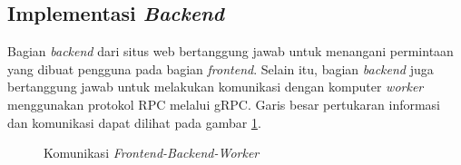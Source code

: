 \subsection{Implementasi \emph{Backend}}
\label{subsec:implementas-backend}

Bagian \emph{backend} dari situs web bertanggung jawab untuk menangani permintaan
yang dibuat pengguna pada bagian \emph{frontend}. Selain itu, bagian \emph{backend}
juga bertanggung jawab untuk melakukan komunikasi dengan komputer \emph{worker} menggunakan
protokol RPC melalui gRPC. Garis besar pertukaran informasi dan komunikasi
dapat dilihat pada gambar \ref{fig:frontend-backend-worker}.

\begin{figure}[H]
  \centering
  \caption{Komunikasi \emph{Frontend-Backend-Worker}}
  \label{fig:frontend-backend-worker}
\end{figure}
